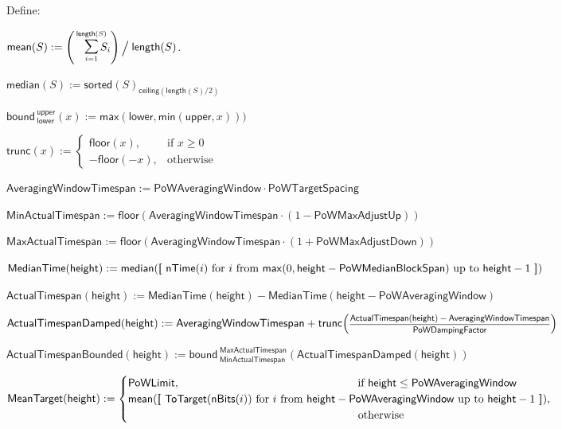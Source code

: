 \documentclass{article}
\newcommand{\introlist}{\needspace{15ex}}
\numberwithin{theorem}{subsection}
\newcommand{\hfrac}[2]{\scalebox{0.8}{$\genfrac{}{}{0.5pt}{0}{#1}{#2}$}}
\newcommand{\overlap}[2]{\rlap{#2}\hspace{#1}{#2}}
\newcommand{\listcomp}[1]{\overlap{0.06em}{\ensuremath{[}}~{#1}~\overlap{0.06em}{\ensuremath{]}}}
\newcommand{\for}{\text{ for }}
\newcommand{\from}{\text{ from }}
\newcommand{\upto}{\text{ up to }}
\newcommand{\squash}{\!\!\!}
\newcommand{\caseif}{\squash\text{if }}
\newcommand{\caseotherwise}{\squash\text{otherwise}}
\newcommand{\sorted}{\mathsf{sorted}}
\newcommand{\length}{\mathsf{length}}
\newcommand{\mean}{\mathsf{mean}}
\newcommand{\median}{\mathsf{median}}
\newcommand{\bound}[2]{\mathsf{bound\,}_{#1}^{#2}}
\newcommand{\Lower}{\mathsf{lower}}
\newcommand{\Upper}{\mathsf{upper}}
\newcommand{\ToTarget}{\mathsf{ToTarget}}
\newcommand{\minimum}{\mathsf{min}}
\newcommand{\maximum}{\mathsf{max}}
\newcommand{\floor}[1]{\mathsf{floor}\!\left({#1}\right)}
\newcommand{\trunc}[1]{\mathsf{trunc}\!\left({#1}\right)}
\newcommand{\sceiling}[1]{\mathsf{ceiling}\left({#1}\right)}
\newcommand{\vop}[3]{\,\raisebox{0.29ex}{\scalebox{0.89}{$\smashoperator[r]{#3_{#1}^{#2}}$\,}}}
\newcommand{\vsum}[2]{\vop{#1}{#2}{\sum}}
\newcommand{\mult}{\cdot}
\newcommand{\BlockHeight}{\mathsf{height}}
\newcommand{\PoWLimit}{\mathsf{PoWLimit}}
\newcommand{\PoWAveragingWindow}{\mathsf{PoWAveragingWindow}}
\newcommand{\PoWMedianBlockSpan}{\mathsf{PoWMedianBlockSpan}}
\newcommand{\PoWMaxAdjustDown}{\mathsf{PoWMaxAdjustDown}}
\newcommand{\PoWMaxAdjustUp}{\mathsf{PoWMaxAdjustUp}}
\newcommand{\PoWDampingFactor}{\mathsf{PoWDampingFactor}}
\newcommand{\PoWTargetSpacing}{\mathsf{PoWTargetSpacing}}
\newcommand{\MeanTarget}{\mathsf{MeanTarget}}
\newcommand{\MedianTime}{\mathsf{MedianTime}}
\newcommand{\AveragingWindowTimespan}{\mathsf{AveragingWindowTimespan}}
\newcommand{\MinActualTimespan}{\mathsf{MinActualTimespan}}
\newcommand{\MaxActualTimespan}{\mathsf{MaxActualTimespan}}
\newcommand{\ActualTimespan}{\mathsf{ActualTimespan}}
\newcommand{\ActualTimespanDamped}{\mathsf{ActualTimespanDamped}}
\newcommand{\ActualTimespanBounded}{\mathsf{ActualTimespanBounded}}
\newcommand{\nTime}{\mathsf{nTime}}
\newcommand{\nBits}{\mathsf{nBits}}
\begin{document}
\vspace{1ex}
\introlist
Define:
\vspace{-1ex}
\begin{formulae}
\hfuzz=10pt
  \item $\mean(S) := \left( \vsum{i=1}{\length(S)} S_i \right) \raisebox{-0.4ex}{\scalebox{1.4}{/\,}} \length(S)$.
  \item $\median(S) := \sorted(S)_{\sceiling{\length(S) / 2}}$
  \item $\bound{\Lower}{\Upper}(x) := \maximum(\Lower, \minimum(\Upper, x)))$
  \item $\trunc{x} := \begin{cases}
          \floor{x},&\caseif x \geq 0 \\
          -\floor{-x},&\caseotherwise
        \end{cases}$

  \item $\AveragingWindowTimespan := \PoWAveragingWindow \mult \PoWTargetSpacing$
  \item $\MinActualTimespan := \floor{\AveragingWindowTimespan \mult (1 - \PoWMaxAdjustUp)}$
  \item $\MaxActualTimespan := \floor{\AveragingWindowTimespan \mult (1 + \PoWMaxAdjustDown)}$
  \item $\MedianTime(\BlockHeight) := \median(\listcomp{\nTime(i) \for i \from
                                              \maximum(0, \BlockHeight - \PoWMedianBlockSpan) \upto \BlockHeight - 1})$
  \item $\ActualTimespan(\BlockHeight) := \MedianTime(\BlockHeight) - \MedianTime(\BlockHeight - \PoWAveragingWindow)$
  \item $\ActualTimespanDamped(\BlockHeight) := \AveragingWindowTimespan + \trunc{\scalebox{0.98}{\hfrac{\ActualTimespan(\BlockHeight) - \AveragingWindowTimespan}{\PoWDampingFactor}}}$
  \item $\ActualTimespanBounded(\BlockHeight) := \bound{\MinActualTimespan}{\MaxActualTimespan}(\ActualTimespanDamped(\BlockHeight))$
  \item $\MeanTarget(\BlockHeight) := \begin{cases}
          \PoWLimit, \hspace{16em}\text{if } \BlockHeight \leq \PoWAveragingWindow \\
          \mean(\listcomp{\ToTarget(\nBits(i)) \for i \from \BlockHeight - \PoWAveragingWindow \upto \BlockHeight - 1}),\\
                     \hspace{20.7em}\text{otherwise}
        \end{cases}$
\end{formulae}
\end{document}

